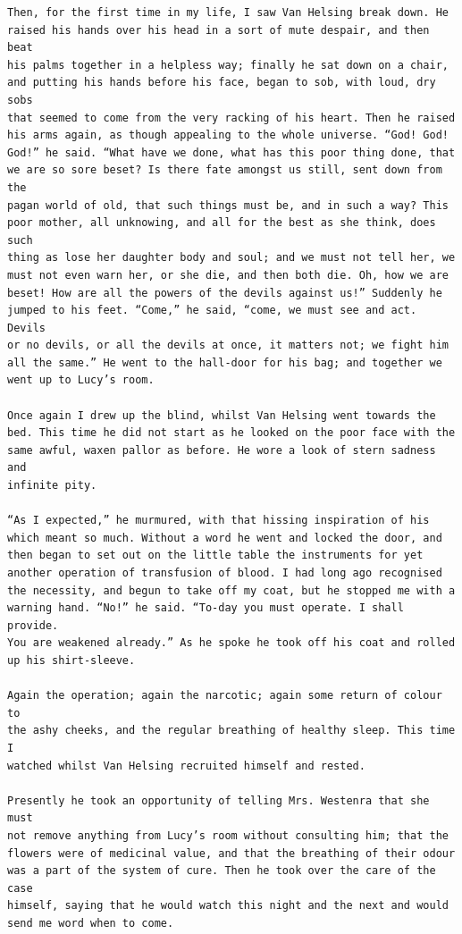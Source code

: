 \documentclass{article}
\begin{document}
\begin{verbatim}
Then, for the first time in my life, I saw Van Helsing break down. He
raised his hands over his head in a sort of mute despair, and then beat
his palms together in a helpless way; finally he sat down on a chair,
and putting his hands before his face, began to sob, with loud, dry sobs
that seemed to come from the very racking of his heart. Then he raised
his arms again, as though appealing to the whole universe. “God! God!
God!” he said. “What have we done, what has this poor thing done, that
we are so sore beset? Is there fate amongst us still, sent down from the
pagan world of old, that such things must be, and in such a way? This
poor mother, all unknowing, and all for the best as she think, does such
thing as lose her daughter body and soul; and we must not tell her, we
must not even warn her, or she die, and then both die. Oh, how we are
beset! How are all the powers of the devils against us!” Suddenly he
jumped to his feet. “Come,” he said, “come, we must see and act. Devils
or no devils, or all the devils at once, it matters not; we fight him
all the same.” He went to the hall-door for his bag; and together we
went up to Lucy’s room.

Once again I drew up the blind, whilst Van Helsing went towards the
bed. This time he did not start as he looked on the poor face with the
same awful, waxen pallor as before. He wore a look of stern sadness and
infinite pity.

“As I expected,” he murmured, with that hissing inspiration of his
which meant so much. Without a word he went and locked the door, and
then began to set out on the little table the instruments for yet
another operation of transfusion of blood. I had long ago recognised
the necessity, and begun to take off my coat, but he stopped me with a
warning hand. “No!” he said. “To-day you must operate. I shall provide.
You are weakened already.” As he spoke he took off his coat and rolled
up his shirt-sleeve.

Again the operation; again the narcotic; again some return of colour to
the ashy cheeks, and the regular breathing of healthy sleep. This time I
watched whilst Van Helsing recruited himself and rested.

Presently he took an opportunity of telling Mrs. Westenra that she must
not remove anything from Lucy’s room without consulting him; that the
flowers were of medicinal value, and that the breathing of their odour
was a part of the system of cure. Then he took over the care of the case
himself, saying that he would watch this night and the next and would
send me word when to come.


\end{verbatim}
\end{document}
